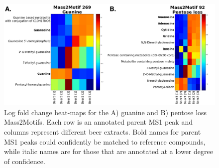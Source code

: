 
\begin{figure}[!htbp]
\centering\includegraphics[width=1.0\linewidth]{07-lda/figures/heatmaps.png}
\centering\caption{Log fold change heat-maps for the A) guanine and B) pentose loss Mass2Motifs. Each row is an annotated parent MS1 peak and columns represent different beer extracts. Bold names for parent MS1 peaks could confidently be matched to reference compounds, while italic names are for those that are annotated at a lower degree of confidence. \label{fig:m2lda-heatmaps}}
\end{figure}

